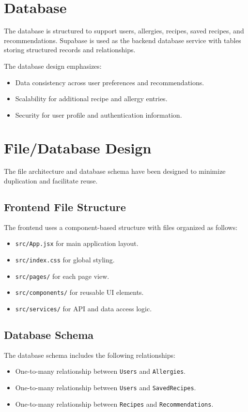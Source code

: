 \documentclass[12pt,a4paper]{report}
\begin{document}
\chapter{Database}
The database is structured to support users, allergies, recipes, saved recipes, and recommendations. Supabase is used as the backend database service with tables storing structured records and relationships.

The database design emphasizes:
\begin{itemize}
  \item Data consistency across user preferences and recommendations.
  \item Scalability for additional recipe and allergy entries.
  \item Security for user profile and authentication information.
\end{itemize}

\chapter{File/Database Design}
The file architecture and database schema have been designed to minimize duplication and facilitate reuse.

\section{Frontend File Structure}
The frontend uses a component-based structure with files organized as follows:
\begin{itemize}
  \item \texttt{src/App.jsx} for main application layout.
  \item \texttt{src/index.css} for global styling.
  \item \texttt{src/pages/} for each page view.
  \item \texttt{src/components/} for reusable UI elements.
  \item \texttt{src/services/} for API and data access logic.
\end{itemize}

\section{Database Schema}
The database schema includes the following relationships:
\begin{itemize}
  \item One-to-many relationship between \texttt{Users} and \texttt{Allergies}.
  \item One-to-many relationship between \texttt{Users} and \texttt{SavedRecipes}.
  \item One-to-many relationship between \texttt{Recipes} and \texttt{Recommendations}. 
\end{itemize}
\end{document}
